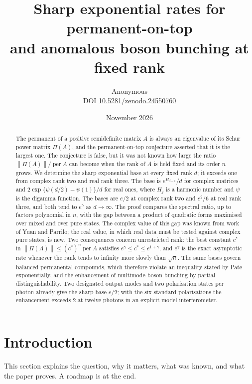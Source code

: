 \documentclass[11pt,a4paper]{article}
\title{Sharp exponential rates for permanent-on-top\\and anomalous boson bunching at fixed rank}
\author{Anonymous\\[3pt]{\small DOI \href{https://doi.org/10.5281/zenodo.24550760}{10.5281/zenodo.24550760}}}
\date{November 2026}
\theoremstyle{remark}
\newcommand{\per}{\operatorname{per}}
\newcommand{\norm}[1]{\left\lVert#1\right\rVert}
\begin{document}
\maketitle
\begin{abstract}
The permanent of a positive semidefinite matrix $A$ is always an eigenvalue of its Schur power matrix $\Pi(A)$, and the permanent-on-top conjecture asserted that it is the largest one. The conjecture is false, but it was not known how large the ratio $\norm{\Pi(A)}/\per A$ can become when the rank of $A$ is held fixed and its order $n$ grows. We determine the sharp exponential base at every fixed rank $d$; it exceeds one from complex rank two and real rank three. The base is $e^{H_{d-1}}/d$ for complex matrices and $2\exp\{\psi(d/2)-\psi(1)\}/d$ for real ones, where $H_j$ is a harmonic number and $\psi$ is the digamma function. The bases are $e/2$ at complex rank two and $e^2/6$ at real rank three, and both tend to $e^\gamma$ as $d\to\infty$. The proof compares the spectral ratio, up to factors polynomial in $n$, with the gap between a product of quadratic forms maximised over mixed and over pure states. The complex value of this gap was known from work of Yuan and Parrilo; the real value, in which real data must be tested against complex pure states, is new. Two consequences concern unrestricted rank: the best constant $c^*$ in $\norm{\Pi(A)}\le (c^*)^n\per A$ satisfies $e^\gamma\le c^*\le e^{1+\gamma}$, and $e^\gamma$ is the exact asymptotic rate whenever the rank tends to infinity more slowly than $\sqrt n$. The same bases govern balanced permanental compounds, which therefore violate an inequality stated by Pate exponentially, and the enhancement of multimode boson bunching by partial distinguishability. Two designated output modes and two polarisation states per photon already give the sharp base $e/2$; with the six standard polarisations the enhancement exceeds $2$ at twelve photons in an explicit model interferometer.
\end{abstract}

\section{Introduction}\label{sec:intro}
This section explains the question, why it matters, what was known, and what the paper proves. A roadmap is at the end.
\end{document}

